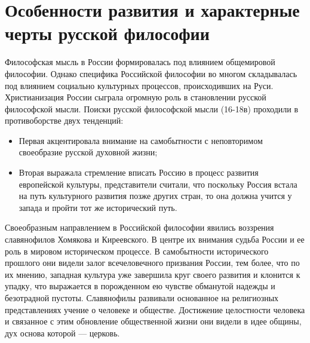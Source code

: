 \documentclass[12pt]{article}
\begin{document}
\section{Особенности развития и характерные черты русской философии}
Философская мысль в России формировалась под влиянием общемировой философии. Однако специфика Российской философии во многом складывалась
под влиянием социально культурных процессов, происходивших на Руси. Христианизация России сыграла огромную
роль  в  становлении  русской  философской  мысли.  Поиски  русской  философской  мысли  (16-18в)  проходили  в  противоборстве  двух
тенденций:
\begin{itemize}
\item Первая акцентировала внимание на самобытности с неповторимом своеобразие русской духовной жизни;
 \item Вторая выражала стремление вписать Россию в процесс развития европейской культуры, представители считали,
   что поскольку Россия встала на путь культурного развития
позже других стран, то она должна учится у запада и пройти тот же исторический путь.
 \end{itemize}
Своеобразным направлением в Российской философии
явились воззрения славянофилов Хомякова и Киреевского.  В центре их внимания судьба России и ее роль в
мировом
историческом процессе. В самобытности исторического прошлого они видели залог всечеловечного призвания
России, тем более, что по
их мнению, западная культура уже завершила круг своего развития и клонится к упадку, что
выражается в порожденном
ею  чувстве  обманутой  надежды  и  безотрадной  пустоты.  Славянофилы  развивали  основанное  на  религиозных
представлениях учение о человеке и обществе. Достижение  целостности человека и связанное с этим обновление общественной
жизни они видели в идее общины, дух основа которой --- церковь. 
\end{document}
